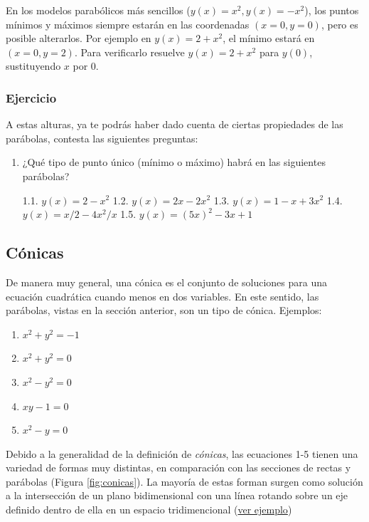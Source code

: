 \documentclass[
]{book}
\providecommand{\tightlist}{%
  \setlength{\itemsep}{0pt}\setlength{\parskip}{0pt}}
\begin{document}
En los modelos parabólicos más sencillos (\(y(x) = x^2, y(x) = -x^2\)), los puntos mínimos y máximos siempre estarán en las coordenadas \((x = 0, y = 0)\), pero es posible alterarlos. Por ejemplo en \(y(x) = 2 + x^2\), el mínimo estará en \((x = 0, y = 2)\). Para verificarlo resuelve \(y(x) = 2 + x^2\) para \(y(0)\), sustituyendo \(x\) por \(0\).

\hypertarget{ejercicio}{%
\subsubsection{Ejercicio}\label{ejercicio}}

A estas alturas, ya te podrás haber dado cuenta de ciertas propiedades de las parábolas, contesta las siguientes preguntas:

\begin{enumerate}
\def\labelenumi{\arabic{enumi}.}
\item
  ¿Qué tipo de punto único (mínimo o máximo) habrá en las siguientes parábolas?

  1.1. \(y(x) = 2 - x^2\)
  1.2. \(y(x) = 2x - 2x^2\)
  1.3. \(y(x) = 1 - x + 3x^2\)
  1.4. \(y(x) = x/2 - 4x^2/x\)
  1.5. \(y(x) = (5x)^2 - 3x + 1\)
\end{enumerate}

\hypertarget{cuxf3nicas}{%
\subsection{Cónicas}\label{cuxf3nicas}}

De manera muy general, una cónica es el conjunto de soluciones para una ecuación cuadrática cuando menos en dos variables. En este sentido, las parábolas, vistas en la sección anterior, son un tipo de cónica. Ejemplos:

\begin{enumerate}
\def\labelenumi{\arabic{enumi}.}
\tightlist
\item
  \(x^2 + y^2 = -1\)
\item
  \(x^2 + y^2 = 0\)
\item
  \(x^2 - y^2 = 0\)
\item
  \(xy - 1 = 0\)
\item
  \(x^2 - y = 0\)
\end{enumerate}

Debido a la generalidad de la definición de \emph{cónicas}, las ecuaciones 1-5 tienen una variedad de formas muy distintas, en comparación con las secciones de rectas y parábolas (Figura \ref{fig:conicas}). La mayoría de estas forman surgen como solución a la intersección de un plano bidimensional con una línea rotando sobre un eje definido dentro de ella en un espacio tridimencional (\href{https://www.mathplanet.com/Oldsite/media/28029/conic.png}{ver ejemplo})
\end{document}
